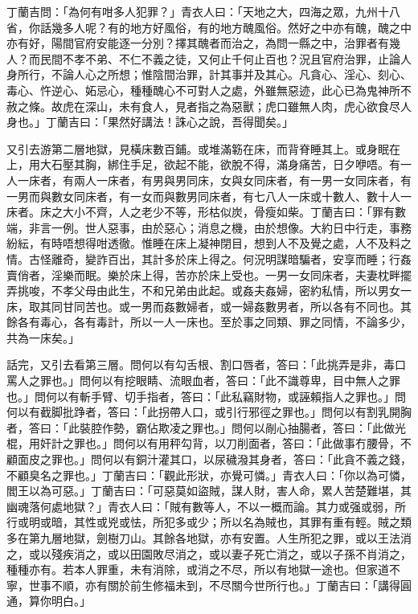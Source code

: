 \documentclass[a5paper, 12pt, openany]{book} %
\begin{document}
	丁蘭吉問：「為何有咁多人犯罪？」青衣人曰：「天地之大，四海之眾，九州十八省，你話幾多人呢？有的地方好風俗，有的地方醜風俗。然好之中亦有醜，醜之中亦有好，陽間官府安能逐一分別？擇其醜者而治之，為問一縣之中，治罪者有幾人？而民間不孝不弟、不仁不義之徒，又何止千何止百也？況且官府治罪，止論人身所行，不論人心之所想；惟陰間治罪，計其事并及其心。凡貪心、淫心、刻心、毒心、忤逆心、妬忌心，種種醜心不可對人之處，外雖無惡迹，此心已為鬼神所不赦之條。故虎在深山，未有食人，見者指之為惡獸；虎口雖無人肉，虎心欲食尽人身也。」丁蘭吉曰：「果然好講法！誅心之說，吾得聞矣。」

	又引去游第二層地獄，見橫床數百鋪。或堆滿簕在床，而背脊睡其上。或身眠在上，用大石壓其胸，綁住手足，欲起不能，欲脫不得，滿身痛苦，日夕咿唔。有一人一床者，有兩人一床者，有男與男同床，女與女同床者，有一男一女同床者，有一男而與數女同床者，有一女而與數男同床者，有七八人一床或十數人、數十人一床者。床之大小不齊，人之老少不等，形枯似炭，骨瘦如柴。丁蘭吉曰：「罪有數端，非言一例。世人惡事，由於惡心；消息之機，由於想像。大約日中行走，事務紛紜，有時唔想得咁透徹。惟睡在床上凝神閉目，想到人不及覺之處，人不及料之情。古怪離奇，變詐百出，其計多於床上得之。何況明謀暗騙者，安享而睡；行姦賣俏者，淫樂而眠。樂於床上得，苦亦於床上受也。一男一女同床者，夫妻枕畔擺弄挑唆，不孝父母由此生，不和兄弟由此起。或姦夫姦婦，密約私情，所以男女一床，取其同甘同苦也。或一男而姦數婦者，或一婦姦數男者，所以各有不同也。其餘各有毒心，各有毒計，所以一人一床也。至於事之同類、罪之同情，不論多少，共為一床矣。」

	話完，又引去看第三層。問何以有勾舌根、割口唇者，答曰：「此挑弄是非，毒口罵人之罪也。」問何以有挖眼睛、流眼血者，答曰：「此不識尊卑，目中無人之罪也。」問何以有斬手臂、切手指者，答曰：「此私竊財物，或誣賴指人之罪也。」問何以有截脚批踭者，答曰：「此拐帶人口，或引行邪徑之罪也。」問何以有割乳開胸者，答曰：「此裝腔作勢，霸佔欺凌之罪也。」問何以剮心抽腸者，答曰：「此做光棍，用奸計之罪也。」問何以有用秤勾背，以刀削面者，答曰：「此做事冇腰骨，不顧面皮之罪也。」問何以有銅汁灌其口，以尿穢潑其身者，答曰：「此貪不義之錢，不顧臭名之罪也。」丁蘭吉曰：「觀此形狀，亦覺可憐。」青衣人曰：「你以為可憐，閻王以為可惡。」丁蘭吉曰：「可惡莫如盜賊，謀人財，害人命，累人苦楚難堪，其幽魂落何處地獄？」青衣人曰：「賊有數等人，不以一概而論。其力或强或弱，所行或明或暗，其性或兇或怯，所犯多或少；所以名為賊也，其罪有重有輕。賊之類多在第九層地獄，劍樹刀山。其餘各地獄，亦有安置。人生所犯之罪，或以王法消之，或以殘疾消之，或以田園敗尽消之，或以妻子死亡消之，或以子孫不肖消之，種種亦有。若本人罪重，未有消除，或消之不尽，所以有地獄一途也。但家道不寧，世事不順，亦有關於前生修福未到，不尽關今世所行也。」丁蘭吉曰：「講得圓通，算你明白。」
\end{document}
